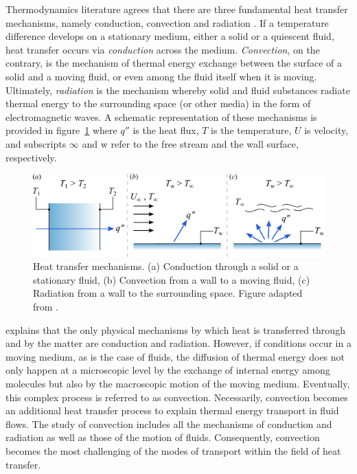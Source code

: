 Thermodynamics literature agrees that there are three fundamental heat transfer mechanisms, namely conduction, convection and radiation \citep{bejan1948HT,eckert1959HMT,bergman2011fundamentals,Lienhard2020HT}. If a temperature difference develops on a stationary medium, either a solid or a quiescent fluid, heat transfer occurs via \textit{conduction} across the medium. \textit{Convection}, on the contrary, is the mechanism of thermal energy exchange between the surface of a solid and a moving fluid, or even among the fluid itself when it is moving. Ultimately, \textit{radiation} is the mechanism whereby solid and fluid substances radiate thermal energy to the surrounding space (or other media) in the form of electromagnetic waves. A schematic representation of these mechanisms is provided in figure~\ref{fig:HTmethods} where $q''$ is the heat flux, $T$ is the temperature, $U$ is velocity, and subscripts $\infty$ and $\mathrm{w}$ refer to the free stream and the wall surface, respectively.

\begin{figure}
    \centering
    \includegraphics[width = 0.8\linewidth]{figures/dibujo_heat.pdf}
    \caption{Heat transfer mechanisms. (a) Conduction through a solid or a stationary fluid, (b) Convection from a wall to a moving fluid, (c) Radiation from a wall to the surrounding space. Figure adapted from \citet{bergman2011fundamentals}.}
    \label{fig:HTmethods}
\end{figure}

\citet{Gebhart1971HT} explains that the only physical mechanisms by which heat is transferred through and by the matter are conduction and radiation. However, if conditions occur in a moving medium, as is the case of fluids, the diffusion of thermal energy does not only happen at a microscopic level by the exchange of internal energy among molecules but also by the macroscopic motion of the moving medium. Eventually, this complex process is referred to as convection. Necessarily, convection becomes an additional heat transfer process to explain thermal energy transport in fluid flows. The study of convection includes all the mechanisms of conduction and radiation as well as those of the motion of fluids. Consequently, convection becomes the most challenging of the modes of transport within the field of heat transfer.

